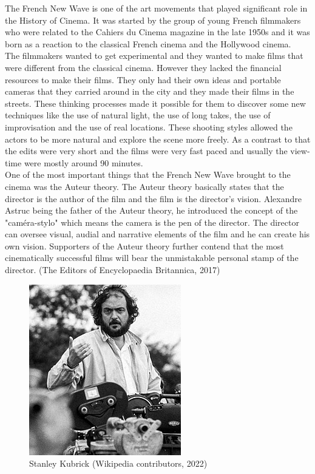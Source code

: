 \documentclass[12pt]{article}
\begin{document}
\maketitle

The French New Wave is one of the art movements that played significant role in the History of Cinema.
It was started by the group of young French filmmakers who were related to the Cahiers du Cinema magazine in the late 1950s and
it was born as a reaction to the classical French cinema and the Hollywood cinema.
\\
The filmmakers wanted to get experimental and they wanted to make films that were different from the classical cinema. However they
lacked the financial resources to make their films. They only had their own ideas and portable cameras that they carried around in the city
and they made their films in the streets. These thinking processes made it possible for them to discover some new techniques like the use of natural light,
the use of long takes, the use of improvisation and the use of real locations. These shooting styles allowed the actors to be more natural and explore the scene
more freely. As a contrast to that the edits were very short and the films were very fast paced and usually the view-time were mostly
around 90 minutes.
\\
One of the most important things that the French New Wave brought to the cinema was the Auteur theory. The Auteur theory basically states that the director is the
author of the film and the film is the director's vision. Alexandre Astruc being the father of the Auteur theory, he introduced the concept of the "caméra-stylo"
which means the camera is the pen of the director. The director can oversee visual, audial and narrative elements of the film and he can create his own vision.
Supporters of the Auteur theory further contend that the most cinematically successful films will bear the unmistakable personal stamp of the director. (The Editors of Encyclopaedia Britannica, 2017)
\\

\begin{figure}[h]
        \begin{center}
                \includegraphics{kubrick}
                \caption{Stanley Kubrick (Wikipedia contributors, 2022)}
        \end{center}
\end{figure}
\end{document}
